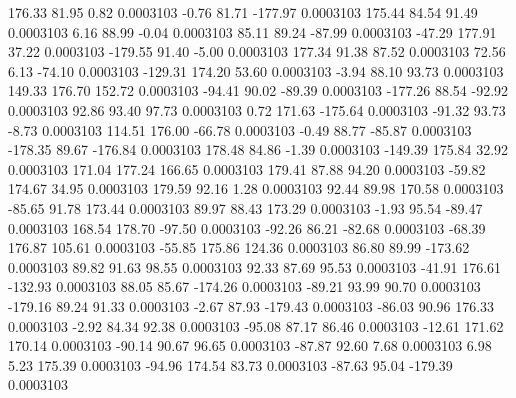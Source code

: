       176.33       81.95        0.82     0.0003103
       -0.76       81.71     -177.97     0.0003103
      175.44       84.54       91.49     0.0003103
        6.16       88.99       -0.04     0.0003103
       85.11       89.24      -87.99     0.0003103
      -47.29      177.91       37.22     0.0003103
     -179.55       91.40       -5.00     0.0003103
      177.34       91.38       87.52     0.0003103
       72.56        6.13      -74.10     0.0003103
     -129.31      174.20       53.60     0.0003103
       -3.94       88.10       93.73     0.0003103
      149.33      176.70      152.72     0.0003103
      -94.41       90.02      -89.39     0.0003103
     -177.26       88.54      -92.92     0.0003103
       92.86       93.40       97.73     0.0003103
        0.72      171.63     -175.64     0.0003103
      -91.32       93.73       -8.73     0.0003103
      114.51      176.00      -66.78     0.0003103
       -0.49       88.77      -85.87     0.0003103
     -178.35       89.67     -176.84     0.0003103
      178.48       84.86       -1.39     0.0003103
     -149.39      175.84       32.92     0.0003103
      171.04      177.24      166.65     0.0003103
      179.41       87.88       94.20     0.0003103
      -59.82      174.67       34.95     0.0003103
      179.59       92.16        1.28     0.0003103
       92.44       89.98      170.58     0.0003103
      -85.65       91.78      173.44     0.0003103
       89.97       88.43      173.29     0.0003103
       -1.93       95.54      -89.47     0.0003103
      168.54      178.70      -97.50     0.0003103
      -92.26       86.21      -82.68     0.0003103
      -68.39      176.87      105.61     0.0003103
      -55.85      175.86      124.36     0.0003103
       86.80       89.99     -173.62     0.0003103
       89.82       91.63       98.55     0.0003103
       92.33       87.69       95.53     0.0003103
      -41.91      176.61     -132.93     0.0003103
       88.05       85.67     -174.26     0.0003103
      -89.21       93.99       90.70     0.0003103
     -179.16       89.24       91.33     0.0003103
       -2.67       87.93     -179.43     0.0003103
      -86.03       90.96      176.33     0.0003103
       -2.92       84.34       92.38     0.0003103
      -95.08       87.17       86.46     0.0003103
      -12.61      171.62      170.14     0.0003103
      -90.14       90.67       96.65     0.0003103
      -87.87       92.60        7.68     0.0003103
        6.98        5.23      175.39     0.0003103
      -94.96      174.54       83.73     0.0003103
      -87.63       95.04     -179.39     0.0003103
